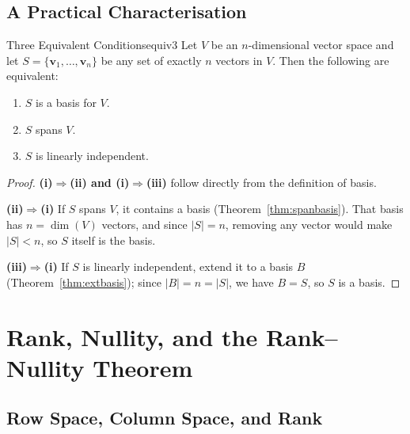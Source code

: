 \documentclass[12pt,a4paper]{article}
\newcommand{\vv}[1]{\mathbf{#1}}
\begin{document}
		\subsection{A Practical Characterisation}
		
		\begin{theorem}{Three Equivalent Conditions}{equiv3}
			Let $V$ be an $n$-dimensional vector space and let
			$S = \{\vv{v}_1, \ldots, \vv{v}_n\}$ be any set of exactly $n$ vectors in $V$.
			Then the following are equivalent:
			\begin{enumerate}[label=(\roman*), leftmargin=2.5em]
				\item $S$ is a basis for $V$.
				\item $S$ spans $V$.
				\item $S$ is linearly independent.
			\end{enumerate}
		\end{theorem}
		
		\begin{proof}
			\textbf{(i)$\Rightarrow$(ii) and (i)$\Rightarrow$(iii)} follow directly from
			the definition of basis.
			
			\textbf{(ii)$\Rightarrow$(i)}\; If $S$ spans $V$, it contains a basis
			(Theorem~\ref{thm:spanbasis}).  That basis has $n = \dim(V)$ vectors, and
			since $|S| = n$, removing any vector would make $|S| < n$, so $S$ itself is
			the basis.
			
			\textbf{(iii)$\Rightarrow$(i)}\; If $S$ is linearly independent, extend it
			to a basis $B$ (Theorem~\ref{thm:extbasis}); since $|B| = n = |S|$, we have
			$B = S$, so $S$ is a basis.
		\end{proof}
		
		\section{Rank, Nullity, and the Rank--Nullity Theorem}
		\label{sec:ranknullity}
		
		\subsection{Row Space, Column Space, and Rank}
		
\end{document}
